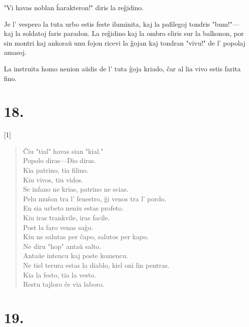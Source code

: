 \documentclass[ngerman,12pt,twoside]{book}
\begin{document}
"Vi havas noblan ĥarakteron!" diris la reĝidino.

Je l' vespero la tuta urbo estis feste iluminita, kaj la pafilegoj tondris "bum!"---kaj la soldatoj faris paradon. La reĝidino kaj la ombro eliris sur la balkonon, por sin montri kaj ankoraŭ unu fojon ricevi la ĝojan kaj tondran "vivu!" de l' popolaj amasoj.

La instruita homo nenion aŭdis de l' tuta ĝoja kriado, ĉar al lia vivo estis farita fino.

\begin{center}
\end{center}


\section*{18.}

{\centering\scalebox{1.6}[1]{}\par}

\begin{verse}
Ĉiu "tial" havas sian "kial."\\
Popolo diras---Dio diras.\\
Kia patrino, tia filino.\\
Kiu vivos, tiu vidos.\\
Se infano ne krias, patrino ne scias.\\
Pelu muŝon tra l' fenestro, ĝi venos tra l' pordo.\\
En sia urbeto neniu estas profeto.\\
Kiu iras trankvile, iras facile.\\
Post la faro venas saĝo.\\
Kiu ne salutas per ĉapo, salutos per kapo.\\
Ne diru "hop" antaŭ salto.\\
Antaŭe intencu kaj poste komencu.\\
Ne tiel terura estas la diablo, kiel oni lin pentras.\\
Kia la festo, tia la vesto.\\
Restu tajloro ĉe via laboro.\\
\end{verse}

\begin{center}
\end{center}


\section*{19.}
\end{document}
